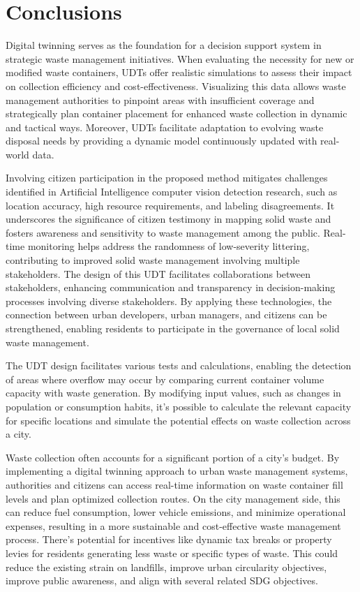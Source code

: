 \documentclass[authoryear,preprint,review,11pt,doubleblind]{elsarticle}
\begin{document}
    \section{Conclusions} \label{sec:conclusions}

    Digital twinning serves as the foundation for a decision support system in strategic waste management initiatives. When evaluating the necessity for new or modified waste containers, UDTs offer realistic simulations to assess their impact on collection efficiency and cost-effectiveness. Visualizing this data allows waste management authorities to pinpoint areas with insufficient coverage and strategically plan container placement for enhanced waste collection in dynamic and tactical ways. Moreover, UDTs facilitate adaptation to evolving waste disposal needs by providing a dynamic model continuously updated with real-world data.
    
    Involving citizen participation in the proposed method mitigates challenges identified in Artificial Intelligence computer vision detection research, such as location accuracy, high resource requirements, and labeling disagreements. It underscores the significance of citizen testimony in mapping solid waste and fosters awareness and sensitivity to waste management among the public. Real-time monitoring helps address the randomness of low-severity littering, contributing to improved solid waste management involving multiple stakeholders.  The design of this UDT facilitates collaborations between stakeholders, enhancing communication and transparency in decision-making processes involving diverse stakeholders. By applying these technologies, the connection between urban developers, urban managers, and citizens can be strengthened, enabling residents to participate in the governance of local solid waste management.
    
    The UDT design facilitates various tests and calculations, enabling the detection of areas where overflow may occur by comparing current container volume capacity with waste generation.  By modifying input values, such as changes in population or consumption habits, it's possible to calculate the relevant capacity for specific locations and simulate the potential effects on waste collection across a city.

    Waste collection often accounts for a significant portion of a city's budget. By implementing a digital twinning approach to urban waste management systems, authorities and citizens can access real-time information on waste container fill levels and plan optimized collection routes. On the city management side, this can reduce fuel consumption, lower vehicle emissions, and minimize operational expenses, resulting in a more sustainable and cost-effective waste management process. There's potential for incentives like dynamic tax breaks or property levies for residents generating less waste or specific types of waste. This could reduce the existing strain on landfills, improve urban circularity objectives, improve public awareness, and align with several related SDG objectives.
\end{document}
